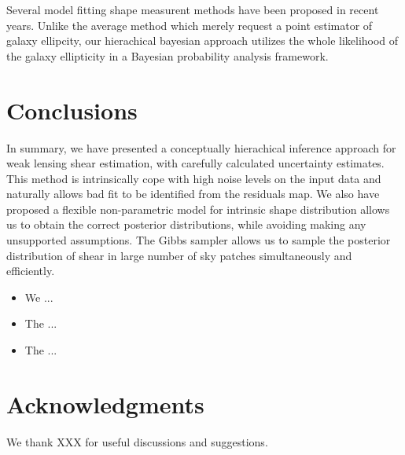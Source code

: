 \documentclass[useAMS,usenatbib]{mn2e}
\begin{document}
Several  model fitting  shape measurent methods have been proposed in recent years.
Unlike the average method which merely request a point estimator of galaxy ellipcity, our 
hierachical bayesian approach utilizes the whole likelihood of the galaxy ellipticity in a Bayesian probability analysis framework.





\section{Conclusions}

\label{sec:conclusions}

In summary, we have presented a conceptually hierachical inference
approach for weak lensing shear estimation, with carefully calculated 
uncertainty estimates. This method is intrinsically cope with high noise
levels on the input data and naturally allows bad fit to be identified 
from the residuals map. We also have proposed a flexible non-parametric model 
for intrinsic shape distribution allows us to obtain the correct posterior 
distributions, while avoiding making any unsupported assumptions. The Gibbs
sampler allows us to sample the posterior distribution of shear in large number of
sky patches simultaneously and efficiently.


\begin{itemize}
\item We ...
\item The ...
\item The ...
\end{itemize}



\section*{Acknowledgments}

We thank XXX for useful discussions and suggestions.



% 
% 
% 
% 
\end{document}

